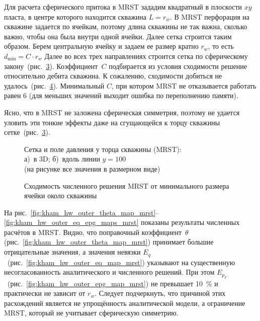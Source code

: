 \documentclass{article}
\begin{document}
Для расчета сферического притока в MRST зададим квадратный в плоскости $xy$ пласта,
в центре которого находится скважина $L=r_w$. В MRST перфорация на скважине задается
по ячейкам, поэтому длина скважины не так важна, сколько важно, чтобы она была внутри
одной ячейки. Далее сетка строится таким образом. Берем центральную ячейку и задаем ее
размер кратно $r_w$, то есть $d_{\text{min}} = C \cdot r_w$ Далее во всех трех направлениях
строится сетка по сферическому закону~(рис.~\ref{fig:kham_hw_outer_grid_mrst}). Коэффициент~$C$
подбирается из условия сходимости решение относительно дебита скважина. К сожалению,
сходимости добиться не удалось~(рис.~\ref{fig:kham_hw_outer_q_C_conv_MRST}).
Минимальный $C$, при котором MRST не отказывается работать равен 6 (для меньших значений выходит ошибка по переполнению памяти).

Ясно, что в MRST не заложена сферическая симметрия, поэтому не удается уловить эти тонкие эффекты даже на сгущающейся к торцу скважины сетке~(рис.~\ref{fig:kham_hw_outer_grid_mrst}).
\begin{figure}[H]
	\centering
	\begin{subfigure}{0.48\textwidth}
		\centering
		
		\caption{}
		\label{fig:kham_hw_outer_grid_mrst_3D}
	\end{subfigure}
	\hfill
	\begin{subfigure}{0.48\textwidth}
		\centering
		
		\caption{}
		\label{fig:kham_hw_outer_grid_mrst_xz}
	\end{subfigure}
	\caption{
		Сетка и поле давления у торца скважины (MRST): \\
		а)~в 3D; %
		б)~вдоль линии $y=100$ \\
		(на рисунке все значения в размерном виде)
	}
	\label{fig:kham_hw_outer_grid_mrst}
\end{figure}

\begin{figure}[H]
	\centering
	
	\caption{Сходимость численного решения MRST от минимального размера ячейки около скважины}
	\label{fig:kham_hw_outer_q_C_conv_MRST}
\end{figure}

На рис.~\ref{fig:kham_hw_outer_theta_map_mrst}--\ref{fig:kham_hw_outer_eq_epg_maps_mrst}
показаны результаты численных расчётов в MRST. Видно, что поправочный коэффициент~$\theta$
(рис.~\ref{fig:kham_hw_outer_theta_map_mrst}) принимает большие отрицательные значения,
а значения невязки $E_q$~(рис.~\ref{fig:kham_hw_outer_eq_map_mrst}) указывают на существенную
несогласованность аналитического и численного решений. При этом $E_{p_\Gamma}$~(рис.~\ref{fig:kham_hw_outer_epg_map_mrst})
не превышает 10~\% и практически не зависит от $r_w$. Следует подчеркнуть, что причиной этих
расхождений является не упрощённость аналитической модели, а ограничение MRST, который не учитывает
сферическую симметрию.
\end{document}
